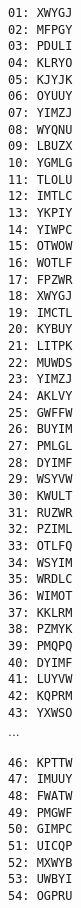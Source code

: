 \documentclass[11pt]{article}
\begin{document}
  \begin{minipage}{0.2\linewidth}
\texttt{01: XWYGJ}\\
\texttt{02: MFPGY}\\
\texttt{03: PDULI}\\
\texttt{04: KLRYO}\\
\texttt{05: KJYJK}\\
\texttt{06: OYUUY}\\
\texttt{07: YIMZJ}\\
\texttt{08: WYQNU}\\
\texttt{09: LBUZX}\\
\texttt{10: YGMLG}\\
\texttt{11: TLOLU}\\
\texttt{12: IMTLC}\\
\texttt{13: YKPIY}\\
\texttt{14: YIWPC}\\
\texttt{15: OTWOW}\\
\texttt{16: WOTLF}\\
\texttt{17: FPZWR}\\
\texttt{18: XWYGJ}\\
\texttt{19: IMCTL}\\
\texttt{20: KYBUY}\\
\texttt{21: LITPK}\\
\texttt{22: MUWDS}\\
\texttt{23: YIMZJ}\\
\texttt{24: AKLVY}\\
\texttt{25: GWFFW}\\
\texttt{26: BUYIM}\\
\texttt{27: PMLGL}\\
\texttt{28: DYIMF}\\
\texttt{29: WSYVW}\\
\texttt{30: KWULT}\\
\texttt{31: RUZWR}\\
\texttt{32: PZIML}\\
\texttt{33: OTLFQ}\\
\texttt{34: WSYIM}\\
\texttt{35: WRDLC}\\
\texttt{36: WIMOT}\\
\texttt{37: KKLRM}\\
\texttt{38: PZMYK}\\
\texttt{39: PMQPQ}\\
\texttt{40: DYIMF}\\
\texttt{41: LUYVW}\\
\texttt{42: KQPRM}\\
\texttt{43: YXWSO}\\
...

\texttt{46: KPTTW}\\
\texttt{47: IMUUY}\\
\texttt{48: FWATW}\\
\texttt{49: PMGWF}\\
\texttt{50: GIMPC}\\
\texttt{51: UICQP}\\
\texttt{52: MXWYB}\\
\texttt{53: UWBYI}\\
\texttt{54: OGPRU}\\
  \end{minipage}
\end{document}
